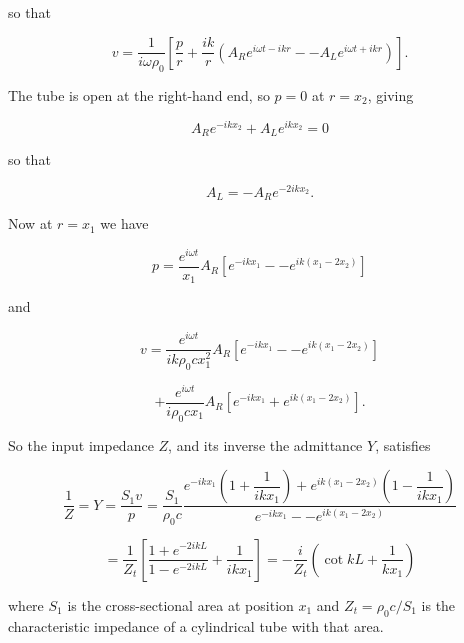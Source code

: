   \noindent{}so that 

  \begin{equation*}v=\dfrac{1}{i \omega \rho_0}\left[ 
  \dfrac{p}{r}+\dfrac{ik}{r}\left(A_R e^{i \omega t -ikr} -- A_L e^{i \omega t 
  +ikr} \right) \right] . \tag{4}\end{equation*} 

  The tube is open at the right-hand end, so $p=0$ at $r=x_2$, giving 

  \begin{equation*}A_R e^{-ikx_2} + A_L e^{ikx_2} = 0 \tag{5}\end{equation*} 

  \noindent{}so that 

  \begin{equation*}A_L=-A_R e^{-2ikx_2} . \tag{6}\end{equation*} 

  Now at $r=x_1$ we have 

  \begin{equation*}p=\dfrac{e^{i \omega t}}{x_1} A_R \left[ e^{-ikx_1} -- 
  e^{ik(x_1-2x_2)} \right] \tag{7}\end{equation*} 

  \noindent{}and 

  \begin{equation*}v= \dfrac{e^{i \omega t}}{ik\rho_0 c x_1^2} A_R \left[ 
  e^{-ikx_1} -- e^{ik(x_1-2x_2)} \right] \end{equation*} 

  \begin{equation*}+ \dfrac{e^{i \omega t}}{i\rho_0 c x_1} A_R \left[ 
  e^{-ikx_1}+ e^{ik(x_1-2x_2)} \right] . \tag{8}\end{equation*} 

  So the input impedance $Z$, and its inverse the admittance $Y$, satisfies 

  \begin{equation*}\dfrac{1}{Z}=Y=\dfrac{S_1v}{p}=\dfrac{S_1}{\rho_0 c} 
  \dfrac{e^{-ikx_1} \left(1+\dfrac{1}{ikx_1}\right) + e^{ik(x_1-2x_2)} 
  \left(1-\dfrac{1}{ikx_1} \right)}{e^{-ikx_1} -- 
  e^{ik(x_1-2x_2)}}\end{equation*} 

  \begin{equation*}=\dfrac{1}{Z_t}\left[ \dfrac{1+e^{-2ikL}}{1-e^{-2ikL}}+ 
  \dfrac{1}{ikx_1}\right]=-\dfrac{i}{Z_t}\left(\cot kL + \dfrac{1}{kx_1} 
  \right) \tag{9}\end{equation*} 

  \noindent{}where $S_1$ is the cross-sectional area at position $x_1$ and 
  $Z_t=\rho_0 c/S_1$ is the characteristic impedance of a cylindrical tube with 
  that area. 

